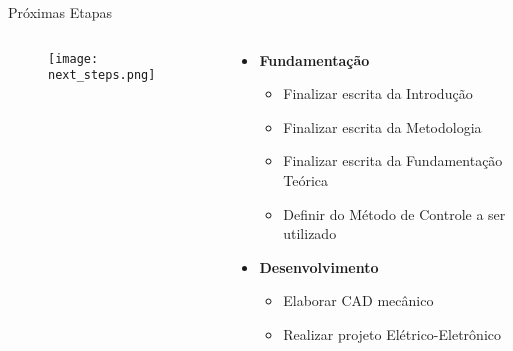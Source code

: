 \begin{frame}[t]{Próximas Etapas}
    \begin{columns}
        \begin{column}{0.25\textwidth}
            \begin{figure}
                \texttt{[image: next\_steps.png]}
            \end{figure}            
        \end{column}
        \begin{column}{0.75\textwidth}
            \begin{itemize}
                \item \textbf{Fundamentação}
                \begin{itemize}
                    \item Finalizar escrita da Introdução
                    \item Finalizar escrita da Metodologia
                    \item Finalizar escrita da Fundamentação Teórica
                    \item Definir do Método de Controle a ser utilizado     
                \end{itemize}
                \item \textbf{Desenvolvimento}
                \begin{itemize}
                    \item Elaborar CAD mecânico
                    \item Realizar projeto Elétrico-Eletrônico
                \end{itemize}
            \end{itemize}            
        \end{column}
    \end{columns}

\end{frame}

